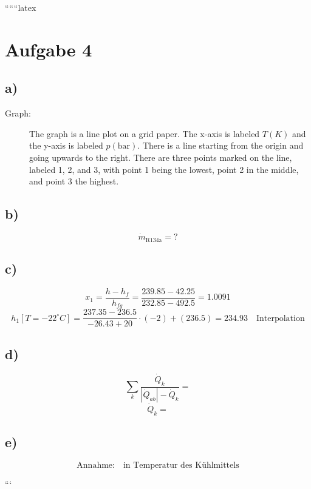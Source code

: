 
``````latex


\section*{Aufgabe 4}

\subsection*{a)}
\begin{description}
    \item[Graph:] The graph is a line plot on a grid paper. The x-axis is labeled $T(K)$ and the y-axis is labeled $p(\text{bar})$. There is a line starting from the origin and going upwards to the right. There are three points marked on the line, labeled 1, 2, and 3, with point 1 being the lowest, point 2 in the middle, and point 3 the highest.
\end{description}

\subsection*{b)}
\[
\dot{m}_{\text{R134a}} = ?
\]

\subsection*{c)}
\[
x_1 = \frac{h - h_f}{h_{fg}} = \frac{239.85 - 42.25}{232.85 - 492.5} = 1.0091
\]
\[
h_1 [T=-22^\circ C] = \frac{237.35 - 236.5}{-26.43 + 20} \cdot (-2) + (236.5) = 234.93 \quad \text{Interpolation}
\]

\subsection*{d)}
\[
\sum_k \frac{\dot{Q}_k}{|\dot{Q}_{ab}| - \dot{Q}_k} =
\]
\[
\dot{Q}_k =
\]

\subsection*{e)}
\[
\text{Annahme:} \quad \text{in Temperatur des Kühlmittels}
\]

```